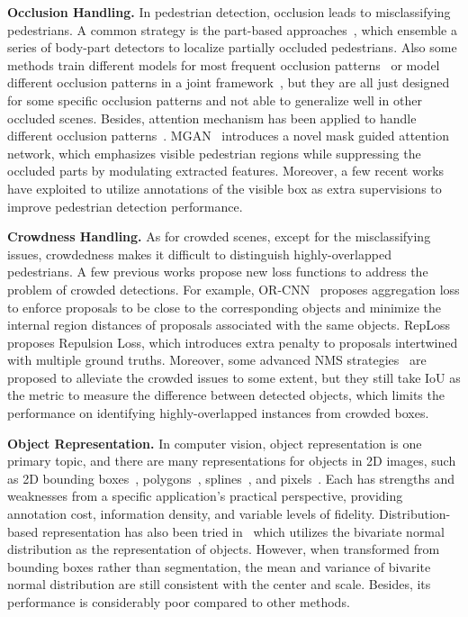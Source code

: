\documentclass{article}
\begin{document}
\textbf{Occlusion Handling.}
In pedestrian detection, occlusion leads to misclassifying pedestrians. 
A common strategy is the part-based approaches~\cite{OR-CNN, part, pedhunter, deep}, which ensemble a series of body-part detectors to localize partially occluded pedestrians.
Also some methods train different models for most frequent occlusion patterns~\cite{occlusion, Parts} or model different occlusion patterns in a joint framework~\cite{multi-label, joint}, but they are all just designed for some specific occlusion patterns and not able to generalize well in other occluded scenes.
Besides, attention mechanism has been applied to handle different occlusion patterns~\cite{part, MGAN}.
MGAN~\cite{MGAN} introduces a novel mask guided attention network, which emphasizes visible pedestrian regions while suppressing the occluded parts by modulating extracted features.
Moreover, a few recent works~\cite{bibox, PBM} have exploited to utilize annotations of the visible box as extra supervisions to improve pedestrian detection performance. 



\textbf{Crowdness Handling.}
As for crowded scenes, except for the misclassifying issues, crowdedness makes it difficult to distinguish highly-overlapped pedestrians.
A few previous works propose new loss functions to address the problem of crowded detections.
For example, OR-CNN~\cite{OR-CNN} proposes aggregation loss to enforce proposals to be close to the corresponding objects and minimize the internal region distances of proposals associated with the same objects.
RepLoss~\cite{RepLoss} proposes Repulsion Loss, which introduces extra penalty to proposals intertwined with multiple ground truths. 
Moreover, some advanced NMS strategies~\cite{convnet, SoftNMS, AdaptiveNMS, SofterNMS, PBM} are proposed to alleviate the crowded issues to some extent, 
but they still take IoU as the metric to measure the difference between detected objects, which limits the performance on identifying highly-overlapped instances from crowded boxes.



\textbf{Object Representation.}
In computer vision, object representation is one primary topic, and there are many representations for objects in 2D images, such as 2D bounding boxes~\cite{faster}, polygons~\cite{polygon}, splines~\cite{spline}, and pixels~\cite{pixels}.
Each has strengths and weaknesses from a specific application's practical perspective, providing annotation cost, information density, and variable levels of fidelity. 
Distribution-based representation has also been tried in~\cite{Distribution} which utilizes the bivariate normal distribution as the representation of objects. However, 
when transformed from bounding boxes rather than segmentation, the mean and variance of bivarite normal distribution are still consistent with the center and scale.
Besides, its performance is considerably poor compared to other methods.
\end{document}
